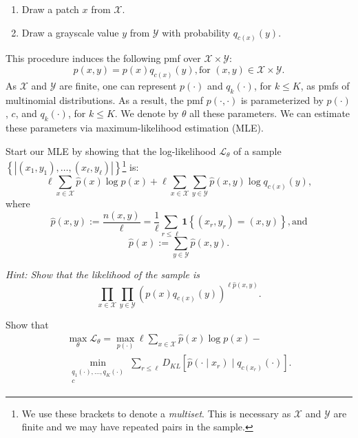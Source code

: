\begin{enumerate}
\item Draw a patch $x$ from $\mathcal{X}$.
\item Draw a grayscale value $y$ from $\mathcal{Y}$ with probability $q_{c(x)}(y)$.
\end{enumerate}

This procedure induces the following pmf over $\mathcal{X} \times \mathcal{Y}$:
%
\begin{equation}
p(x, y) = p(x) q_{c(x)}(y), \text{for $(x, y) \in \mathcal{X} \times \mathcal{Y}$}.
\end{equation}
%
As $\mathcal{X}$ and $\mathcal{Y}$ are finite, one can represent $p(\cdot)$ and $q_k(\cdot)$, for $k \leq K$, as pmfs of multinomial distributions. As a result, the pmf $p(\cdot, \cdot)$ is parameterized by $p(\cdot)$, $c$, and $q_k(\cdot)$, for $k \leq K$. We denote by $\theta$ all these parameters. We can estimate these parameters via maximum-likelihood estimation (MLE).

\begin{exercise}
Start our MLE by showing that the log-likelihood $\mathcal{L}_\theta$ of a sample $\left\{|(x_1, y_1), \ldots, (x_\ell, y_\ell)|\right\}$\footnote{We use these brackets to denote a \emph{multiset}. This is necessary as $\mathcal{X}$ and $\mathcal{Y}$ are finite and we may have repeated pairs in the sample.} is:
%
\begin{equation}
\ell\sum_{x \in \mathcal{X}} \hat{p}(x) \log p(x) + \ell \sum_{x \in \mathcal{X}}\sum_{y \in \mathcal{Y}} \hat{p}\left(x, y\right) \log q_{c(x)}(y),
\end{equation}
%
where
%
\begin{equation}
\hat{p}\left(x, y\right) := \frac{n(x, y)}{\ell} = \frac{1}{\ell}\sum_{r \leq \ell} \mathbf{1}\left\{(x_r, y_r) = (x, y)\right\}, \text{and}
\end{equation}
%
\begin{equation}
\hat{p}(x) := \sum_{y \in \mathcal{Y}}\hat{p}(x, y).
\end{equation}

\textit{Hint: Show that the likelihood of the sample is}
%
\begin{equation}
\prod_{x \in \mathcal{X}}\prod_{y \in \mathcal{Y}} \left(p(x) q_{c(x)}(y)\right)^{\ell \hat{p}\left(x, y\right)}.
\end{equation}
%
\end{exercise}

\begin{exercise}
Show that
%
\begin{align}
\max_{\theta} \mathcal{L}_\theta = \max_{p(\cdot)} \ell \sum_{x \in \mathcal{X}} \hat{p}(x) \log p(x) - \\
\min_{\substack{q_1(\cdot), \ldots, q_K(\cdot)\\c}}\sum_{r \leq \ell} D_{KL}\left[\hat{p}\left(\cdot \mid x_r\right) \mid q_{c(x_r)}(\cdot)\right].
\end{align}
%
\end{exercise}

